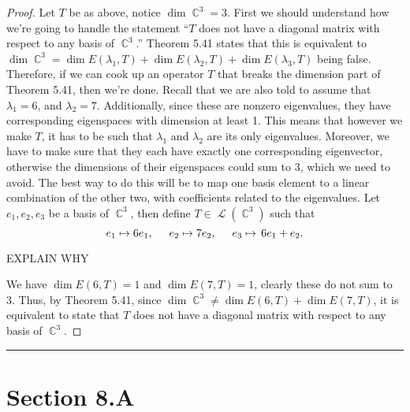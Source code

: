 \documentclass[letterpaper, 12pt]{amsart}
\DeclareMathOperator{\C}{\mathbb{C}}				%
\DeclareMathOperator{\Ell}{\mathscr{L}}				%
\theoremstyle{definition}  							%
\begin{document}
		\begin{proof}
		Let $T$ be as above, notice $\dim \C^{3} = 3$.
		First we should understand how we're going to handle the statement ``$T$ does not have a diagonal matrix with respect to any basis of $\C^{3}$.''
		Theorem 5.41 states that this is equivalent to $\dim \C^{3} = \dim E(\lambda_{1},T) + \dim E(\lambda_{2},T) + \dim E(\lambda_{3},T)$ being false.
		Therefore, if we can cook up an operator $T$ that breaks the dimension part of Theorem 5.41, then we're done.
		Recall that we are also told to assume that $\lambda_{1} = 6$, and $\lambda_{2} = 7$.
		Additionally, since these are nonzero eigenvalues, they have corresponding eigenspaces with dimension at least 1.
		This means that however we make $T$, it has to be such that $\lambda_{1}$ and $\lambda_{2}$ are its only eigenvalues.
		Moreover, we have to make sure that they each have exactly one corresponding eigenvector, otherwise the dimensions of their eigenspaces could sum to 3, which we need to avoid.
		The best way to do this will be to map one basis element to a linear combination of the other two, with coefficients related to the eigenvalues.
		Let $e_{1},e_{2},e_{3}$ be a basis of $\C^{3}$, then define $T \in \Ell(\C^{3})$ such that $$e_{1} \mapsto 6e_{1}, \hspace{5mm} e_{2} \mapsto 7e_{2}, \hspace{5mm} e_{3} \mapsto \, 6e_{1} + e_{2}.$$

		\vspace*{5mm}
		EXPLAIN WHY
		\vspace*{5mm}

		We have $\dim E(6,T) = 1$ and $\dim E(7,T) = 1$, clearly these do not sum to 3.
		Thus, by Theorem 5.41, since $\dim \C^3 \neq \dim E(6,T) + \dim E(7,T)$, it is equivalent to state that $T$ does not have a diagonal matrix with respect to any basis of $\C^{3}$.
		\end{proof}
		\vspace*{2mm}
		\hrule
		\vspace*{2mm}

	\section*{Section 8.A}
\end{document}
